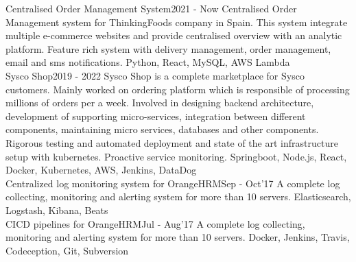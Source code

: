 

\begin{projects}
    \project
	{Centralised Order Management System}{2021 - Now}
	{}
	{
	    Centralised Order Management system for ThinkingFoods company in Spain. This system integrate multiple e-commerce websites and provide centralised overview with an analytic platform. Feature rich system with delivery management, order management, email and sms notifications.  
	}
	{Python, React, MySQL, AWS Lambda}
	\\	
	\project
	{Sysco Shop}{2019 - 2022}
	{ }
	{
	   Sysco Shop is a complete marketplace for Sysco customers. Mainly worked on ordering platform which is
	    responsible of processing millions of orders per a week. Involved in designing backend architecture, development of supporting micro-services, integration between different components, maintaining micro services, databases and other components. Rigorous testing and automated deployment and state of the art infrastructure setup with kubernetes. Proactive service monitoring.  
	}
	{Springboot, Node.js, React, Docker, Kubernetes, AWS, Jenkins, DataDog}
	\\		
	\project
	{Centralized log monitoring system for OrangeHRM}{Sep - Oct’17}
	{}
	{
	    A complete log collecting, monitoring and alerting system for more
        than 10 servers.
	}
	{Elasticsearch, Logstash, Kibana, Beats}
	\\
	\project
	{CICD pipelines for OrangeHRM}{Jul - Aug’17}
	{ }
	{
	    A complete log collecting, monitoring and alerting system for more
        than 10 servers.
	}
	{Docker, Jenkins, Travis, Codeception, Git, Subversion}

\end{projects}